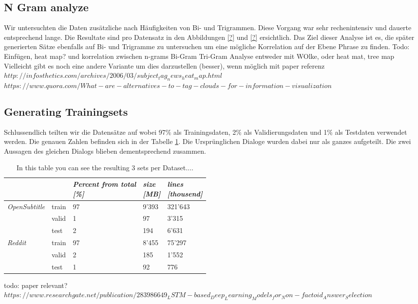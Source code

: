 \subsection{N Gram analyze}
Wir untersuchten die Daten zusätzliche nach Häufigkeiten von Bi- und Trigrammen. Diese Vorgang war sehr rechenintensiv und dauerte entsprechend lange. Die Resultate sind pro Datensatz in den Abbildungen \ref{?} und \ref{?} ersichtlich. Das Ziel dieser Analyse ist es, die später generierten Sätze ebenfalls auf Bi- und Trigramme zu untersuchen um eine mögliche Korrelation auf der Ebene Phrase zu finden.
Todo: Einfügen, heat map? und korrelation zwischen n-grams
Bi-Gram Tri-Gram Analyse entweder mit WOlke, oder heat mat, tree map
Vielleicht gibt es noch eine andere Variante um dies darzustellen (besser), wenn möglich mit paper referenz
$http://infosthetics.com/archives/2006/03/subject_tag_news_heat_map.html$
$https://www.quora.com/What-are-alternatives-to-tag-clouds-for-information-visualization$

\subsection{Generating Trainingsets}
Schlussendlich teilten wir die Datensätze auf wobei 97\% als Trainingsdaten, 2\% als Validierungsdaten und 1\% als Testdaten verwendet werden. Die genauen Zahlen befinden sich in der Tabelle \ref{tbl:data:split:corpus}. Die Ursprünglichen Dialoge wurden dabei nur als ganzes aufgeteilt. Die zwei Aussagen des gleichen Dialogs blieben dementsprechend zusammen.
\begin{table}[]
	\centering
	\begin{adjustbox}{max width=\textwidth}
		\centering
		\small
		\begin{tabular}{lllll}
			\toprule
			&  \specialcell{\emph{set}}
			&  \specialcell{\emph{Percent from total} \\\textit{[\%]}}
			&  \specialcell{\emph{size} \\\textit{[MB]}}
			&  \specialcell{\emph{lines} \\\textit{[thousend]}}\\
			\midrule
			\emph{OpenSubtitle}		&train	&97	&9'393	&321'643	\\
									&valid	&1	&97		&3'315	\\
									&test	&2	&194	&6'631	\\
			\emph{Reddit}			&train	&97	&8'455	&75'297	\\
									&valid	&2	&185	&1'552	\\
									&test	&1	&92		&776	\\
			\bottomrule
		\end{tabular}
	\end{adjustbox}
	\caption{In this table you can see the resulting 3 sets per Dataset....}
	\label{tbl:data:split:corpus}
\end{table}

todo: paper relevant? $https://www.researchgate.net/publication/283986649_LSTM-based_Deep_Learning_Models_for_Non-factoid_Answer_Selection$
